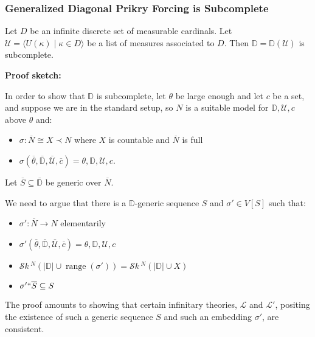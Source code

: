 \documentclass[utf8x,xcolor=svgnames,8pt]{beamer}
\newcommand{\D}{\mathbb{D}}
\newcommand{\N}{{\overline{N}}}
\renewcommand{\S}{{\overline{S}}}
\renewcommand{\U}{\mathcal{U}}
\DeclareMathOperator{\ran}{range}
\DeclareMathOperator{\otp}{otp}
\newcommand{\To}{\longrightarrow}
\newcommand{\st}{\; | \;}
\newcommand{\seq}[2]{\langle #1 \st #2 \rangle}
\newcommand{\SH}{\mathcal{S}\textit{k} \,}
\newcommand{\sk}[3]{\SH^{#1}( {#2} \cup {\ran(#3)} ) }
\newcommand{\Sk}[3]{\SH^{#1}( {#2} \cup {#3} ) }
\begin{document}
\begin{frame}
\frametitle{Generalized Diagonal Prikry Forcing is Subcomplete}
\begin{theorem} Let $D$ be an infinite discrete set of measurable cardinals. %
Let $\U = \seq{ U(\kappa) }{ \kappa \in D }$ be a list of measures associated to $D$. Then $\D=\D(\U)$ is subcomplete. \end{theorem}

\textbf{Proof sketch:}

\vspace{0.5em}

In order to show that $\D$ is subcomplete, let $\theta$ be large enough and let $c$ be a set, and suppose we are in the standard setup, so $N$ is a suitable model for $\D, \U, c$ above $\theta$  and: \begin{itemize}
	\item $\sigma: \N \cong X \prec N$ where $X$ is countable and $\N$ is full
	\item $\sigma(\overline \theta, \overline{\D}, \overline{\U}, \overline c)=\theta, \D, \U, c$.
\end{itemize}
Let $\S \subseteq \overline{\D}$ be generic over $\N$. 

We need to argue that there is a $\D$-generic sequence $S$ and $\sigma' \in V[S]$ such that: \begin{itemize}
	\item $\sigma': \N \To N$ elementarily
	\item $\sigma'(\overline \theta, \overline{\D}, \overline{\U}, \overline c)=\theta, \D, \U, c$
	\item $\sk{N}{|\D|}{\sigma'} = \Sk{N}{|\D|}{X}$	
	\item $\sigma' `` \S \subseteq S$
\end{itemize}
The proof amounts to showing that certain infinitary theories, $\mathcal L$ and $\mathcal L'$, positing the existence of such a generic sequence $S$ and such an embedding $\sigma'$, are consistent.
\end{frame}
\end{document}
